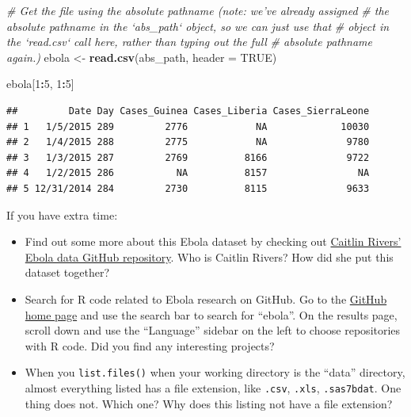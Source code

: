 \documentclass[]{book}
\makeatletter
\newenvironment{Shaded}{\begin{snugshade}}{\end{snugshade}}
\newcommand{\KeywordTok}[1]{\textcolor[rgb]{0.13,0.29,0.53}{\textbf{#1}}}
\newcommand{\DataTypeTok}[1]{\textcolor[rgb]{0.13,0.29,0.53}{#1}}
\newcommand{\DecValTok}[1]{\textcolor[rgb]{0.00,0.00,0.81}{#1}}
\newcommand{\StringTok}[1]{\textcolor[rgb]{0.31,0.60,0.02}{#1}}
\newcommand{\CommentTok}[1]{\textcolor[rgb]{0.56,0.35,0.01}{\textit{#1}}}
\newcommand{\OtherTok}[1]{\textcolor[rgb]{0.56,0.35,0.01}{#1}}
\newcommand{\OperatorTok}[1]{\textcolor[rgb]{0.81,0.36,0.00}{\textbf{#1}}}
\newcommand{\NormalTok}[1]{#1}
\providecommand{\tightlist}{%
  \setlength{\itemsep}{0pt}\setlength{\parskip}{0pt}}
\newenvironment{kframe}{%
\medskip{}
\setlength{\fboxsep}{.8em}
 \def\at@end@of@kframe{}%
 \ifinner\ifhmode%
  \def\at@end@of@kframe{\end{minipage}}%
  \begin{minipage}{\columnwidth}%
 \fi\fi%
 \def\FrameCommand##1{\hskip\@totalleftmargin \hskip-\fboxsep
 \colorbox{shadecolor}{##1}\hskip-\fboxsep
     \hskip-\linewidth \hskip-\@totalleftmargin \hskip\columnwidth}%
 \MakeFramed {\advance\hsize-\width
   \@totalleftmargin\z@ \linewidth\hsize
   \@setminipage}}%
 {\par\unskip\endMakeFramed%
 \at@end@of@kframe}
\renewenvironment{Shaded}{\begin{kframe}}{\end{kframe}}
\theoremstyle{definition}
\theoremstyle{definition}
\theoremstyle{definition}
\theoremstyle{remark}
\makeatother
\begin{document}
\begin{Shaded}
\begin{Highlighting}[]
\CommentTok{# Get the file using the absolute pathname (note: we've already assigned}
\CommentTok{# the absolute pathname in the `abs_path` object, so we can just use that }
\CommentTok{# object in the `read.csv` call here, rather than typing out the full }
\CommentTok{# absolute pathname again.)}
\NormalTok{ebola <-}\StringTok{ }\KeywordTok{read.csv}\NormalTok{(abs_path, }\DataTypeTok{header =} \OtherTok{TRUE}\NormalTok{) }
\end{Highlighting}
\end{Shaded}

\begin{Shaded}
\begin{Highlighting}[]
\NormalTok{ebola[}\DecValTok{1}\OperatorTok{:}\DecValTok{5}\NormalTok{, }\DecValTok{1}\OperatorTok{:}\DecValTok{5}\NormalTok{]}
\end{Highlighting}
\end{Shaded}

\begin{verbatim}
##         Date Day Cases_Guinea Cases_Liberia Cases_SierraLeone
## 1   1/5/2015 289         2776            NA             10030
## 2   1/4/2015 288         2775            NA              9780
## 3   1/3/2015 287         2769          8166              9722
## 4   1/2/2015 286           NA          8157                NA
## 5 12/31/2014 284         2730          8115              9633
\end{verbatim}

If you have extra time:

\begin{itemize}
\tightlist
\item
  Find out some more about this Ebola dataset by checking out
  \href{https://github.com/cmrivers/ebola}{Caitlin Rivers' Ebola data
  GitHub repository}. Who is Caitlin Rivers? How did she put this
  dataset together?
\item
  Search for R code related to Ebola research on GitHub. Go to the
  \href{https://github.com}{GitHub home page} and use the search bar to
  search for ``ebola''. On the results page, scroll down and use the
  ``Language'' sidebar on the left to choose repositories with R code.
  Did you find any interesting projects?
\item
  When you \texttt{list.files()} when your working directory is the
  ``data'' directory, almost everything listed has a file extension,
  like \texttt{.csv}, \texttt{.xls}, \texttt{.sas7bdat}. One thing does
  not. Which one? Why does this listing not have a file extension?
\end{itemize}
\end{document}
